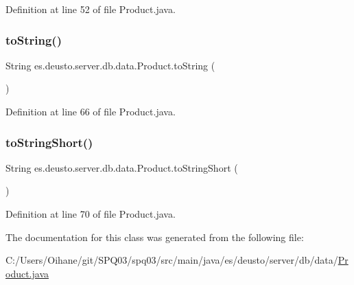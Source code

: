 Definition at line 52 of file Product.\+java.

\mbox{\label{classes_1_1deusto_1_1server_1_1db_1_1data_1_1_product_a4cc3da392d5679515cd8da38f88bc920}} 
\subsubsection{\texorpdfstring{to\+String()}{toString()}}
{\footnotesize\ttfamily String es.\+deusto.\+server.\+db.\+data.\+Product.\+to\+String (\begin{DoxyParamCaption}{ }\end{DoxyParamCaption})}



Definition at line 66 of file Product.\+java.

\mbox{\label{classes_1_1deusto_1_1server_1_1db_1_1data_1_1_product_ada09de3915be881fe42f6f61bfd048f8}} 
\subsubsection{\texorpdfstring{to\+String\+Short()}{toStringShort()}}
{\footnotesize\ttfamily String es.\+deusto.\+server.\+db.\+data.\+Product.\+to\+String\+Short (\begin{DoxyParamCaption}{ }\end{DoxyParamCaption})}



Definition at line 70 of file Product.\+java.



The documentation for this class was generated from the following file\+:\begin{DoxyCompactItemize}
\item 
C\+:/\+Users/\+Oihane/git/\+S\+P\+Q03/spq03/src/main/java/es/deusto/server/db/data/\hyperlink{_product_8java}{Product.\+java}\end{DoxyCompactItemize}

